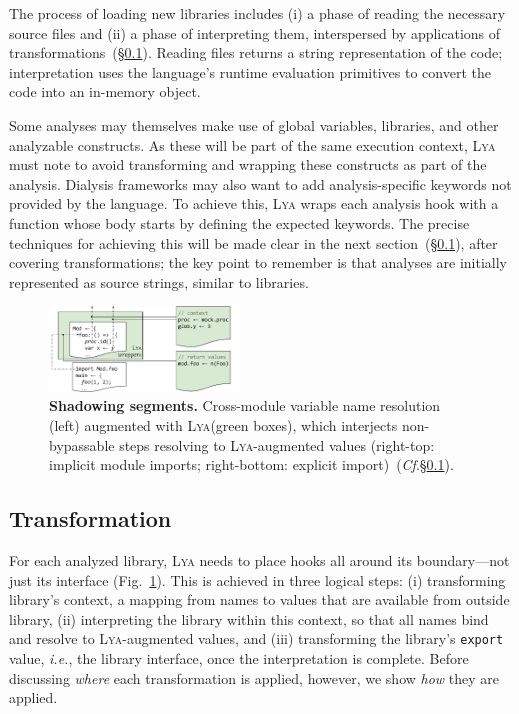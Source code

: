 \documentclass[letterpaper,twocolumn,10pt]{article}
\def\ie{{\em i.e.}, }
\newcommand{\ttt}[1]{\texttt{#1}}
\newcommand{\cf}[1]{(\emph{Cf}.\S\ref{#1})}
\newcommand{\sx}[1]{(\S\ref{#1})}
\newcommand{\sys}{{\scshape Lya}\xspace}
\newcommand{\pc}{PIC\xspace}
\begin{document}
The process of loading new libraries includes (i) a phase of reading the necessary source files and (ii) a phase of interpreting them, interspersed by applications of transformations~\sx{two}.
Reading files returns a string representation of the code; interpretation uses the language's runtime evaluation primitives to convert the code into an in-memory object.

Some analyses may themselves make use of global variables, libraries, and other analyzable constructs.
As these will be part of the same execution context, \sys must note to avoid transforming and wrapping these constructs as part of the analysis.
Dialysis frameworks may also want to add analysis-specific keywords not provided by the language.
To achieve this, \sys wraps each analysis hook with a function whose body starts by defining the expected keywords.
The precise techniques for achieving this will be made clear in the next section~\sx{two}, after covering transformations;
  the key point to remember is that analyses are initially represented as source strings, similar to libraries.

\begin{figure}[t]
\centering 
\includegraphics[width=0.45\textwidth]{./figs/lya_shadowing.pdf}
\caption{
  \textbf{Shadowing segments.}
  \textmd{
  Cross-module variable name resolution (left) augmented with \sys (green boxes), which interjects non-bypassable steps resolving to \sys-augmented values (right-top: implicit module imports; right-bottom: explicit import)~\cf{two}.
  }
  \vspace{-4mm}
}
\label{fig:shadowing}
\end{figure}


\subsection{Transformation}
\label{two}

For each analyzed library, \sys needs to place hooks all around its boundary---not just its interface (Fig.~\ref{fig:shadowing}).
This is achieved in three logical steps:
(i) transforming library's context, a mapping from names to values that are available from outside library,
(ii) interpreting the library within this context, so that all names bind and resolve to \sys-augmented values, and
(iii) transforming the library's \ttt{export} value, \ie the library interface, once the interpretation is complete.
Before discussing \emph{where} each transformation is applied, however, we show \emph{how} they are applied.
\end{document}
